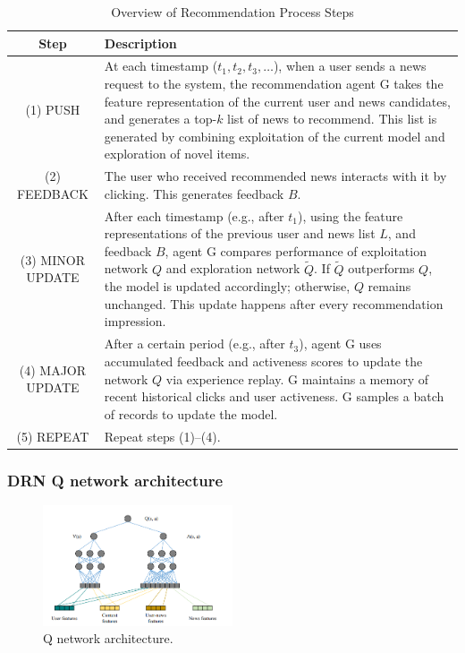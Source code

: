 \documentclass{ieeetj}
\begin{document}
\begin{table}[ht]
    \centering
    \caption{Overview of Recommendation Process Steps}
    \begin{tabularx}{\columnwidth}{|c|X|}
        \hline
        \textbf{Step} & \textbf{Description} \\ \hline
        (1) PUSH & At each timestamp ($t_1, t_2, t_3, \dots$), when a user sends a news request to the system, the recommendation agent G takes the feature representation of the current user and news candidates, and generates a top-$k$ list of news to recommend. This list is generated by combining exploitation of the current model and exploration of novel items. \\ \hline
        (2) FEEDBACK & The user who received recommended news interacts with it by clicking. This generates feedback $B$. \\ \hline
        (3) MINOR UPDATE & After each timestamp (e.g., after $t_1$), using the feature representations of the previous user and news list $L$, and feedback $B$, agent G compares performance of exploitation network $Q$ and exploration network $\widetilde{Q}$. If $\widetilde{Q}$ outperforms $Q$, the model is updated accordingly; otherwise, $Q$ remains unchanged. This update happens after every recommendation impression. \\ \hline
        (4) MAJOR UPDATE & After a certain period (e.g., after $t_3$), agent G uses accumulated feedback and activeness scores to update the network $Q$ via experience replay. G maintains a memory of recent historical clicks and user activeness. G samples a batch of records to update the model. \\ \hline
        (5) REPEAT & Repeat steps (1)–(4). \\ \hline
    \end{tabularx}
    \label{tab:recommendation-process}
\end{table}

\FloatBarrier
\subsubsection{DRN Q network architecture}

\begin{figure}[h]
	\centering
	\includegraphics[width=0.5\textwidth]{figures/drn-q-architecture.png}
	\caption{Q network architecture.}
	\label{fig:drl-q}
\end{figure}
	
\end{document}
